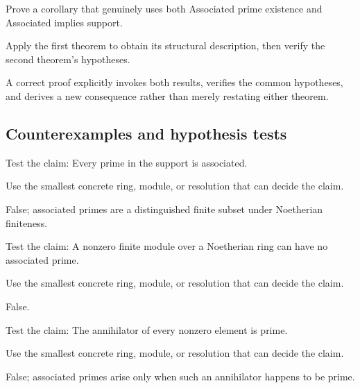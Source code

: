 \begin{exercise}\label{exr:v17-expand-09}
Prove a corollary that genuinely uses both Associated prime existence and Associated implies support.
\end{exercise}
\begin{hint}
Apply the first theorem to obtain its structural description, then verify the second theorem's hypotheses.
\end{hint}
\begin{solution}
A correct proof explicitly invokes both results, verifies the common hypotheses, and derives a new consequence rather than merely restating either theorem.
\end{solution}

\subsection*{Counterexamples and hypothesis tests}

\begin{exercise}\label{exr:v17-expand-10}
Test the claim: Every prime in the support is associated.
\end{exercise}
\begin{hint}
Use the smallest concrete ring, module, or resolution that can decide the claim.
\end{hint}
\begin{solution}
False; associated primes are a distinguished finite subset under Noetherian finiteness.
\end{solution}

\begin{exercise}\label{exr:v17-expand-11}
Test the claim: A nonzero finite module over a Noetherian ring can have no associated prime.
\end{exercise}
\begin{hint}
Use the smallest concrete ring, module, or resolution that can decide the claim.
\end{hint}
\begin{solution}
False.
\end{solution}

\begin{exercise}\label{exr:v17-expand-12}
Test the claim: The annihilator of every nonzero element is prime.
\end{exercise}
\begin{hint}
Use the smallest concrete ring, module, or resolution that can decide the claim.
\end{hint}
\begin{solution}
False; associated primes arise only when such an annihilator happens to be prime.
\end{solution}

